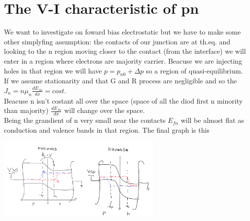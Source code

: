 \section{The V-I characteristic of pn }
We want to investigate on foward bias electrostatic but we have to make some other simplyfing assumption: the contacts of our junction are at th.eq. and looking to the n region moving closer to the contact (from the interface) we will enter in a region where electrons are majority carrier. Beacuse we are injecting holes in that region we will have $p=p_{n0}+\Delta p$ so a region of quasi-equilibrium.\\
If we assume stationarity and that G and R process are negligible and so the $J_n=n\mu_n \frac{dE_{fn}}{dx}=cost$. \\
Beacuse n isn't costant all over the space (space of all the diod first n minority than majority) $\frac{dE_{fn}}{dx}$ will change over the space.\\
Being the grandient of n very small near the contacts $E_{fn}$ will be almost flat as conduction and valence bands in that region.
The final graph is this 

\centering
\includegraphics[width=0.6\textwidth]{pn9.png}\\
\raggedright

